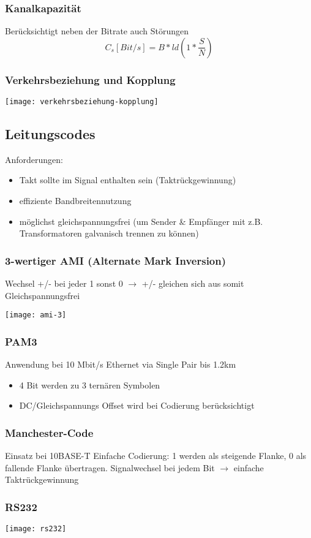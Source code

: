 \subsubsection{Kanalkapazität}
Berücksichtigt neben der Bitrate auch Störungen
$$C_s [Bit/s] = B * ld(1 * \frac{S}{N})$$

\subsubsection{Verkehrsbeziehung und Kopplung}
\begin{center}
	\texttt{[image: verkehrsbeziehung-kopplung]}
\end{center}

\subsection{Leitungscodes}
Anforderungen:
\begin{itemize}
	\item Takt sollte im Signal enthalten sein (Taktrückgewinnung)
	\item effiziente Bandbreitennutzung
	\item möglichst gleichspannungsfrei (um Sender \& Empfänger mit z.B.
	      Transformatoren galvanisch trennen zu können)
\end{itemize}


\subsubsection{3-wertiger AMI (Alternate Mark Inversion)}
Wechsel +/- bei jeder 1 sonst 0 $\rightarrow$ +/- gleichen sich aus
somit Gleichspannungsfrei
\begin{center}
	\texttt{[image: ami-3]}
\end{center}

\subsubsection{PAM3}
Anwendung bei 10 Mbit/s Ethernet via Single Pair bis 1.2km
\begin{itemize}
	\item 4 Bit werden zu 3 ternären Symbolen
	\item DC/Gleichspannungs Offset wird bei Codierung berücksichtigt
\end{itemize}

\subsubsection{Manchester-Code}
Einsatz bei 10BASE-T
Einfache Codierung: 1 werden als steigende Flanke, 0 als fallende Flanke übertragen.
Signalwechsel bei jedem Bit $\rightarrow$ einfache Taktrückgewinnung

\subsubsection{RS232}
\begin{center}
	\texttt{[image: rs232]}
\end{center}





